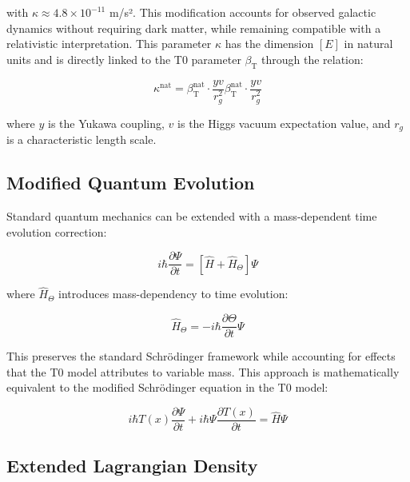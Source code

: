 \documentclass[12pt,a4paper]{article}
\newcommand{\Tfield}{T(x)}
\newcommand{\betaT}{\beta_{\text{T}}}
\begin{document}
	with $\kappa \approx 4.8\times10^{-11}$ m/s². This modification accounts for observed galactic dynamics without requiring dark matter\cite{mcgaugh2016}, while remaining compatible with a relativistic interpretation. This parameter $\kappa$ has the dimension $[E]$ in natural units\cite{pascher_params_2025} and is directly linked to the T0 parameter $\betaT$ through the relation:
	
	\begin{equation}
		\label{eq:kappa_beta}
		\kappa^{\text{nat}} = \betaT^{\text{nat}} \cdot \frac{yv}{r_g^2}\betaT^{\text{nat}} \cdot \frac{yv}{r_g^2}
	\end{equation}
	
	where $y$ is the Yukawa coupling, $v$ is the Higgs vacuum expectation value, and $r_g$ is a characteristic length scale\cite{pascher_lagrange_2025}.
	
	\subsection{Modified Quantum Evolution}
	\label{subsec:quantum_evolution}
	
	Standard quantum mechanics\cite{schrodinger1926} can be extended with a mass-dependent time evolution correction:
	
	\begin{equation}
		\label{eq:extended_schrodinger}
		i\hbar\frac{\partial\Psi}{\partial t} = [\hat{H} + \hat{H}_{\Theta}]\Psi
	\end{equation}
	
	where $\hat{H}_{\Theta}$ introduces mass-dependency to time evolution:
	
	\begin{equation}
		\label{eq:h_theta}
		\hat{H}_{\Theta} = -i\hbar\frac{\partial\Theta}{\partial t}\Psi
	\end{equation}
	
	This preserves the standard Schrödinger framework while accounting for effects that the T0 model attributes to variable mass\cite{pascher_zeit_2025}. This approach is mathematically equivalent to the modified Schrödinger equation in the T0 model\cite{pascher_lagrange_2025}:
	
	\begin{equation}
		\label{eq:t0_schrodinger}
		i\hbar \Tfield \frac{\partial\Psi}{\partial t} + i\hbar \Psi \frac{\partial \Tfield}{\partial t} = \hat{H} \Psi
	\end{equation}
	
	\subsection{Extended Lagrangian Density}
	\label{subsec:extended_lagrangian}
	
\end{document}
